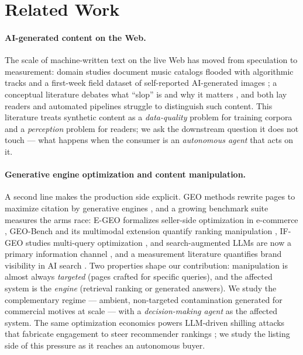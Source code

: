 \section{Related Work}
\label{sec:related}

\paragraph{AI-generated content on the Web.}
The scale of machine-written text on the live Web has moved from speculation to measurement: domain studies document music catalogs flooded with algorithmic tracks \cite{wu2026empirical} and a first-week field dataset of self-reported AI-generated images \cite{zewde2026gptimage}; a conceptual literature debates what ``slop'' is and why it matters \cite{kommers2025slop,nishal2026slop}, and both lay readers \cite{zhu2026humans} and automated pipelines struggle to distinguish such content. This literature treats synthetic content as a \emph{data-quality} problem for training corpora and a \emph{perception} problem for readers; we ask the downstream question it does not touch --- what happens when the consumer is an \emph{autonomous agent} that acts on it.

\paragraph{Generative engine optimization and content manipulation.}
A second line makes the production side explicit. GEO methods rewrite pages to maximize citation by generative engines \cite{wu2025what}, and a growing benchmark suite measures the arms race: E-GEO formalizes seller-side optimization in e-commerce \cite{bagga2025egeo}, GEO-Bench and its multimodal extension quantify ranking manipulation \cite{nimase2026geobench,du2026multimodal}, IF-GEO studies multi-query optimization \cite{zhou2026ifgeo}, and search-augmented LLMs are now a primary information channel \cite{miroyan2025search}, and a measurement literature quantifies brand visibility in AI search \cite{yu2026structural,chen2025generative,schulte2026dont,kumar2026generative}. Two properties shape our contribution: manipulation is almost always \emph{targeted} (pages crafted for specific queries), and the affected system is the \emph{engine} (retrieval ranking or generated answers). We study the complementary regime --- ambient, non-targeted contamination generated for commercial motives at scale --- with a \emph{decision-making agent} as the affected system. The same optimization economics powers LLM-driven shilling attacks that fabricate engagement to steer recommender rankings \cite{gu2025llmbased,qiao2025controllable,li2025semanticshield}; we study the listing side of this pressure as it reaches an autonomous buyer.

